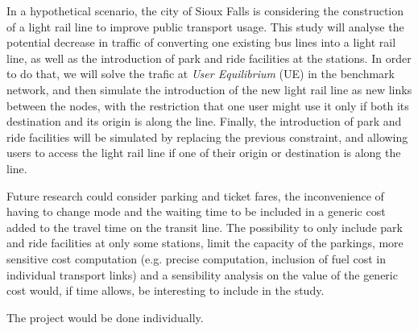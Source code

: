 In a hypothetical scenario, the city of Sioux Falls is considering the construction of a light rail line to improve public transport usage. This study will analyse the potential decrease in traffic of converting one existing bus lines into a light rail line, as well as the introduction of park and ride facilities at the stations. In order to do that, we will solve the trafic at \textit{User Equilibrium} (UE) in the benchmark network, and then simulate the introduction of the new light rail line as new links between the nodes, with the restriction that one user might use it only if both its destination and its origin is along the line. Finally, the introduction of park and ride facilities will be simulated by replacing the previous constraint, and allowing users to access the light rail line if one of their origin or destination is along the line. 

Future research could consider parking and ticket fares, the inconvenience of having to change mode and the waiting time to be included in a generic cost added to the travel time on the transit line. The possibility to only include park and ride facilities at only some stations, limit the capacity of the parkings, more sensitive cost computation (e.g. precise computation, inclusion of fuel cost in individual transport links) and a sensibility analysis on the value of the generic cost would, if time allows, be interesting to include in the study.


The project would be done individually.